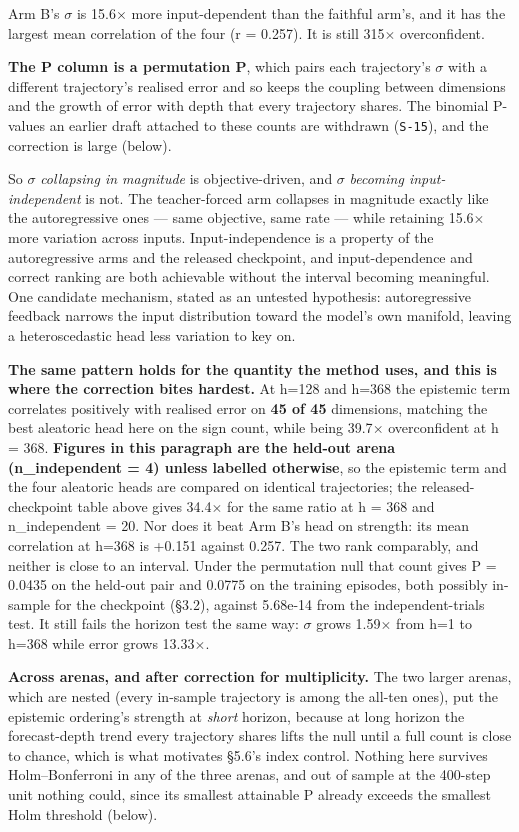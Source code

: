 \documentclass[10pt]{article}
\begin{document}
Arm B's $\sigma$ is 15.6$\times$ more input-dependent than the faithful arm's, and it has the largest mean correlation of the four (r = 0.257). It is still 315$\times$ overconfident.

\textbf{The P column is a permutation P}, which pairs each trajectory's $\sigma$ with a different trajectory's realised error and so keeps the coupling between dimensions and the growth of error with depth that every trajectory shares. The binomial P-values an earlier draft attached to these counts are withdrawn (\texttt{S-15}), and the correction is large (below).

So $\sigma$ \emph{collapsing in magnitude} is objective-driven, and $\sigma$ \emph{becoming input-independent} is not. The teacher-forced arm collapses in magnitude exactly like the autoregressive ones --- same objective, same rate --- while retaining 15.6$\times$ more variation across inputs. Input-independence is a property of the autoregressive arms and the released checkpoint, and input-dependence and correct ranking are both achievable without the interval becoming meaningful. One candidate mechanism, stated as an untested hypothesis: autoregressive feedback narrows the input distribution toward the model's own manifold, leaving a heteroscedastic head less variation to key on.

\textbf{The same pattern holds for the quantity the method uses, and this is where the correction bites hardest.} At h=128 and h=368 the epistemic term correlates positively with realised error on \textbf{45 of 45} dimensions, matching the best aleatoric head here on the sign count, while being 39.7$\times$ overconfident at h = 368. \textbf{Figures in this paragraph are the held-out arena (n\_independent = 4) unless labelled otherwise}, so the epistemic term and the four aleatoric heads are compared on identical trajectories; the released-checkpoint table above gives 34.4$\times$ for the same ratio at h = 368 and n\_independent = 20. Nor does it beat Arm B's head on strength: its mean correlation at h=368 is +0.151 against 0.257. The two rank comparably, and neither is close to an interval. Under the permutation null that count gives P = 0.0435 on the held-out pair and 0.0775 on the training episodes, both possibly in-sample for the checkpoint (\S{}3.2), against 5.68e-14 from the independent-trials test. It still fails the horizon test the same way: $\sigma$ grows 1.59$\times$ from h=1 to h=368 while error grows 13.33$\times$.

\textbf{Across arenas, and after correction for multiplicity.} The two larger arenas, which are nested (every in-sample trajectory is among the all-ten ones), put the epistemic ordering's strength at \emph{short} horizon, because at long horizon the forecast-depth trend every trajectory shares lifts the null until a full count is close to chance, which is what motivates \S{}5.6's index control. Nothing here survives Holm--Bonferroni in any of the three arenas, and out of sample at the 400-step unit nothing could, since its smallest attainable P already exceeds the smallest Holm threshold (below).
\end{document}
